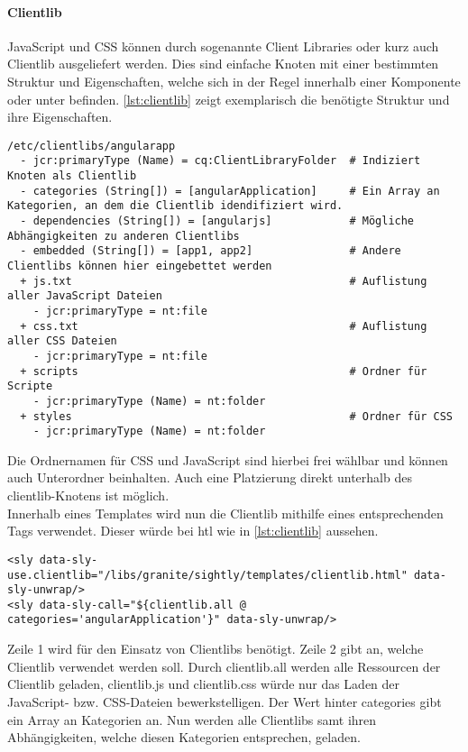 \paragraph{Clientlib}
\label{sec:clientlib}
JavaScript und CSS können durch sogenannte Client Libraries oder kurz auch Clientlib ausgeliefert werden. Dies sind einfache Knoten mit einer bestimmten Struktur und Eigenschaften, welche sich in der Regel innerhalb einer Komponente oder unter  befinden. \autoref{lst:clientlib} zeigt exemplarisch die benötigte Struktur und ihre Eigenschaften.

\begin{lstlisting}[style=jcr, caption=Exemplarische Darstellung einer Clientlib, label=lst:clientlib]
/etc/clientlibs/angularapp
  - jcr:primaryType (Name) = cq:ClientLibraryFolder  # Indiziert Knoten als Clientlib
  - categories (String[]) = [angularApplication]     # Ein Array an Kategorien, an dem die Clientlib idendifiziert wird.
  - dependencies (String[]) = [angularjs]            # Mögliche Abhängigkeiten zu anderen Clientlibs
  - embedded (String[]) = [app1, app2]               # Andere Clientlibs können hier eingebettet werden
  + js.txt                                           # Auflistung aller JavaScript Dateien
    - jcr:primaryType = nt:file
  + css.txt                                          # Auflistung aller CSS Dateien
    - jcr:primaryType = nt:file
  + scripts                                          # Ordner für Scripte
    - jcr:primaryType (Name) = nt:folder
  + styles                                           # Ordner für CSS
    - jcr:primaryType (Name) = nt:folder
\end{lstlisting}

Die Ordnernamen für CSS und JavaScript sind hierbei frei wählbar und können auch Unterordner beinhalten. Auch eine Platzierung direkt unterhalb des clientlib-Knotens ist möglich.\\
Innerhalb eines Templates wird nun die Clientlib mithilfe eines entsprechenden Tags verwendet. Dieser würde bei \ac{htl} wie in \autoref{lst:clientlib} aussehen.

\begin{lstlisting}[style=htmlcssjs,caption=Verwendung einer Clientlib in AEM, label=lst:clientlib_useage]
<sly data-sly-use.clientlib="/libs/granite/sightly/templates/clientlib.html" data-sly-unwrap/>
<sly data-sly-call="${clientlib.all @ categories='angularApplication'}" data-sly-unwrap/>
\end{lstlisting}

Zeile 1 wird für den Einsatz von Clientlibs benötigt. Zeile 2 gibt an, welche Clientlib verwendet werden soll. Durch clientlib.all werden alle Ressourcen der Clientlib geladen, clientlib.js und clientlib.css würde nur das Laden der JavaScript- bzw. CSS-Dateien bewerkstelligen. Der Wert hinter categories gibt ein Array an Kategorien an. Nun werden alle Clientlibs samt ihren Abhängigkeiten, welche diesen Kategorien entsprechen, geladen.